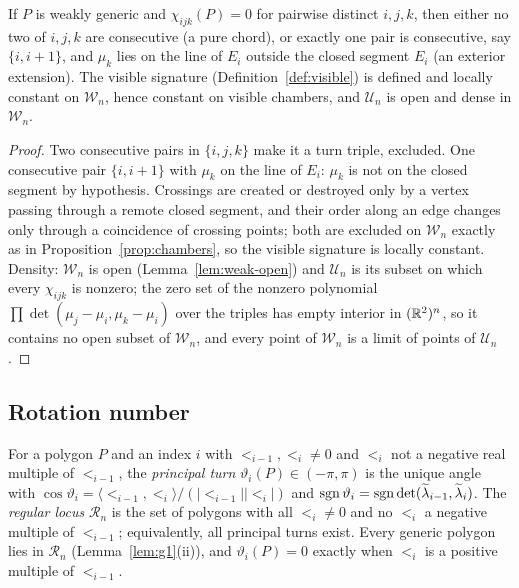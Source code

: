 \begin{lemma}\label{lem:silentlocus}
If $P$ is weakly generic and $\chi_{ijk}(P)=0$ for pairwise distinct
$i,j,k$, then either no two of $i,j,k$ are consecutive (a pure chord), or
exactly one pair is consecutive, say $\{i,i+1\}$, and $\mu_k$ lies on the
line of $E_i$ outside the closed segment $E_i$ (an exterior extension). The
visible signature (Definition~\ref{def:visible}) is defined and locally
constant on $\mathcal W_n$, hence constant on visible chambers, and
$\mathcal U_n$ is open and dense in $\mathcal W_n$. 
\end{lemma}
\begin{proof}
Two consecutive pairs in $\{i,j,k\}$ make it a turn triple, excluded. One
consecutive pair $\{i,i+1\}$ with $\mu_k$ on the line of $E_i$: $\mu_k$ is not
on the closed segment by hypothesis. Crossings are created or destroyed only
by a vertex passing through a remote closed segment, and their order along an
edge changes only through a coincidence of crossing points; both are excluded
on $\mathcal W_n$ exactly as in Proposition~\ref{prop:chambers}, so the
visible signature is locally constant. Density: $\mathcal W_n$ is open
(Lemma~\ref{lem:weak-open}) and $\mathcal U_n$ is its subset on which every
$\chi_{ijk}$ is nonzero; the zero set of the nonzero polynomial
$\prod\det(\mu_j-\mu_i,\mu_k-\mu_i)$ over the triples has empty interior in
$(\mathbb R^2)^n$, so it contains no open subset of $\mathcal W_n$, and every point
of $\mathcal W_n$ is a limit of points of $\mathcal U_n$.
\end{proof}

\subsection{Rotation number}

\begin{definition}\label{def:regular}
For a polygon $P$ and an index $i$ with $\lt_{i-1},\lt_i\neq0$ and $\lt_i$
not a negative real multiple of $\lt_{i-1}$, the \emph{principal turn}
$\vartheta_i(P)\in(-\pi,\pi)$ is the unique angle with
$\cos\vartheta_i=\langle\lt_{i-1},\lt_i\rangle/(|\lt_{i-1}||\lt_i|)$ and
$\operatorname{sgn}\vartheta_i=\operatorname{sgn}\det(\widetilde\lambda_{i-1},\widetilde\lambda_i)$. The \emph{regular locus}
$\mathcal R_n$ is the set of polygons with all $\lt_i\neq0$ and no $\lt_i$ a
negative multiple of $\lt_{i-1}$; equivalently, all principal turns exist.
Every generic polygon lies in $\mathcal R_n$ (Lemma~\ref{lem:g1}(ii)), and
$\vartheta_i(P)=0$ exactly when $\lt_i$ is a positive multiple of $\lt_{i-1}$.
\end{definition}

